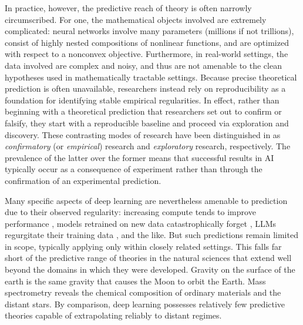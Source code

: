 \documentclass{article}
\begin{document}
In practice, however, the predictive reach of theory is often narrowly circumscribed.
For one, the mathematical objects involved are extremely complicated: neural networks involve many parameters (millions if not trillions), consist of highly nested compositions of nonlinear functions, and are optimized with respect to a nonconvex objective.
Furthermore, in real-world settings, the data involved are complex and noisy, and thus are not amenable to the clean hypotheses used in mathematically tractable settings.
Because precise theoretical prediction is often unavailable, researchers instead rely on reproducibility as a foundation for identifying stable empirical regularities.
In effect, rather than beginning with a theoretical prediction that researchers set out to confirm or falsify, they start with a reproducible baseline and proceed via exploration and discovery.
These contrasting modes of research have been distinguished in \cite{pmlr-v97-bouthillier19a, herrmann2024rethinking_empirical_ml} as \textit{confirmatory} (or \textit{empirical}) research and \textit{exploratory} research, respectively.
The prevalence of the latter over the former means that successful results in AI typically occur as a consequence of experiment rather than through the confirmation of an experimental prediction.


Many specific aspects of deep learning are nevertheless amenable to prediction due to their observed regularity: increasing compute tends to improve performance \cite{kaplan2020scalinglawsneurallanguage}, models retrained on new data catastrophically forget \cite{Kirkpatrick2017catastrophic}, LLMs regurgitate their training data \cite{carlini2021extracting, Nguyen2024UnderstandingTransformers}, and the like.
But such predictions remain limited in scope, typically applying only within closely related settings.
This falls far short of the predictive range of theories in the natural sciences that extend well beyond the domains in which they were developed.
Gravity on the surface of the earth is the same gravity that causes the Moon to orbit the Earth.
Mass spectrometry reveals the chemical composition of ordinary materials and the distant stars.
By comparison, deep learning possesses relatively few predictive theories capable of extrapolating reliably to distant regimes.
\end{document}
